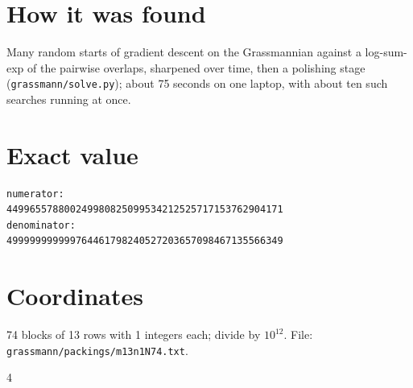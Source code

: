 \documentclass[11pt,a4paper]{article}
\begin{document}
\section{How it was found}
Many random starts of gradient descent on the Grassmannian against a log-sum-exp of the pairwise overlaps, sharpened over time, then a polishing stage (\texttt{grassmann/solve.py}); about 75 seconds on one laptop, with about ten such searches running at once.


\appendix
\section{Exact value}
{\small
\begin{verbatim}
numerator:
449965578800249980825099534212525717153762904171
denominator:
499999999999764461798240527203657098467135566349
\end{verbatim}}

\section{Coordinates}
74 blocks of 13 rows with 1 integers each; divide by $10^{12}$. File: \texttt{grassmann/packings/m13n1N74.txt}.
{\tiny
\begin{multicols}{4}
\end{multicols}}
\end{document}
